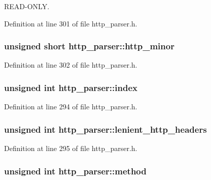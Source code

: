 R\-E\-A\-D-\/\-O\-N\-L\-Y. 



Definition at line 301 of file http\-\_\-parser.\-h.

\hypertarget{structhttp__parser_ae8af6433c824f5348773842db62ad4ab}{
\subsubsection[{http\-\_\-minor}]{\setlength{\rightskip}{0pt plus 5cm}unsigned short http\-\_\-parser\-::http\-\_\-minor}}\label{structhttp__parser_ae8af6433c824f5348773842db62ad4ab}


Definition at line 302 of file http\-\_\-parser.\-h.

\hypertarget{structhttp__parser_a6f7ba706f975f447b3bf72be97facdf8}{
\subsubsection[{index}]{\setlength{\rightskip}{0pt plus 5cm}unsigned int http\-\_\-parser\-::index}}\label{structhttp__parser_a6f7ba706f975f447b3bf72be97facdf8}


Definition at line 294 of file http\-\_\-parser.\-h.

\hypertarget{structhttp__parser_acd80a931fcc87d41999397af1662fc3c}{
\subsubsection[{lenient\-\_\-http\-\_\-headers}]{\setlength{\rightskip}{0pt plus 5cm}unsigned int http\-\_\-parser\-::lenient\-\_\-http\-\_\-headers}}\label{structhttp__parser_acd80a931fcc87d41999397af1662fc3c}


Definition at line 295 of file http\-\_\-parser.\-h.

\hypertarget{structhttp__parser_a7955de339fafd81ad54380845913457d}{
\subsubsection[{method}]{\setlength{\rightskip}{0pt plus 5cm}unsigned int http\-\_\-parser\-::method}}\label{structhttp__parser_a7955de339fafd81ad54380845913457d}


